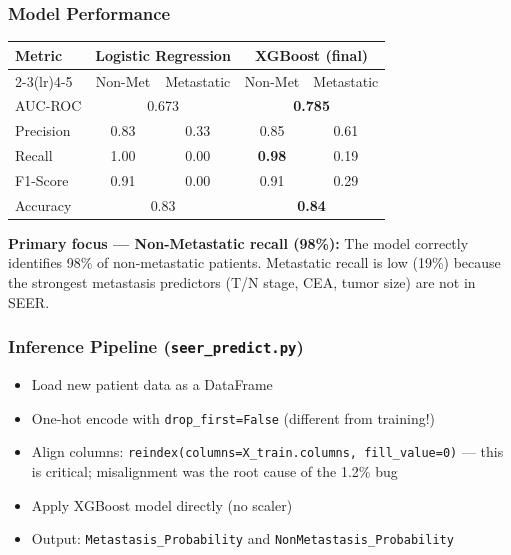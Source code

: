 \documentclass[11pt,letterpaper]{article}
\begin{document}
\subsubsection{Model Performance}
\begin{center}
\begin{tabular}{lcccc}
\toprule
\textbf{Metric} & \multicolumn{2}{c}{\textbf{Logistic Regression}} &
\multicolumn{2}{c}{\textbf{XGBoost (final)}} \\
\cmidrule(lr){2-3}\cmidrule(lr){4-5}
 & Non-Met & Metastatic & Non-Met & Metastatic \\
\midrule
AUC-ROC   & \multicolumn{2}{c}{0.673} & \multicolumn{2}{c}{\textbf{0.785}} \\
Precision & 0.83 & 0.33 & 0.85 & 0.61 \\
Recall    & 1.00 & 0.00 & \textbf{0.98} & 0.19 \\
F1-Score  & 0.91 & 0.00 & 0.91 & 0.29 \\
Accuracy  & \multicolumn{2}{c}{0.83} & \multicolumn{2}{c}{\textbf{0.84}} \\
\bottomrule
\end{tabular}
\end{center}

\medskip
\noindent\textbf{Primary focus — Non-Metastatic recall (98\%):} The model correctly
identifies 98\% of non-metastatic patients. Metastatic recall is low (19\%) because
the strongest metastasis predictors (T/N stage, CEA, tumor size) are not in SEER.

\subsubsection{Inference Pipeline (\texttt{seer\_predict.py})}
\begin{itemize}
  \item Load new patient data as a DataFrame
  \item One-hot encode with \texttt{drop\_first=False} (different from training!)
  \item Align columns: \texttt{reindex(columns=X\_train.columns, fill\_value=0)}
        — this is critical; misalignment was the root cause of the 1.2\% bug
  \item Apply XGBoost model directly (no scaler)
  \item Output: \texttt{Metastasis\_Probability} and \texttt{NonMetastasis\_Probability}
\end{itemize}
\end{document}
